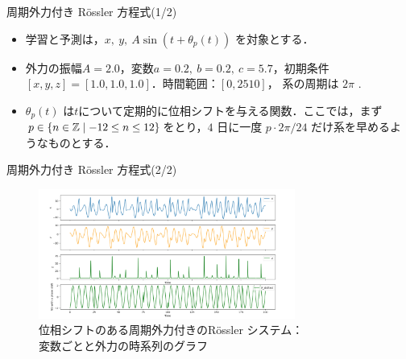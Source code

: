\begin{frame}{周期外力付き Rössler 方程式(1/2)}
\begin{minipage}{0.59\textwidth}
        \begin{itemize}
            \item 学習と予測は，$x,\ y,\ A \sin(t + \theta_p(t))$ を対象とする．
            \item 外力の振幅$A = 2.0$，変数$a = 0.2,\ b = 0.2,\ c = 5.7$，初期条件$ \left[ x, y, z \right] = [1.0, 1.0, 1.0]$．時間範囲：$[0, 2510]$， 系の周期は $2\pi$ .
            \item $\theta_p(t)$ は$t$について定期的に位相シフトを与える関数．ここでは，まず$p \in \left\{ n \in \mathbb{Z} \mid -12 \leq n \leq 12 \right\}$をとり，$4$ 日に一度 $p \cdot 2\pi/24$ だけ系を早めるようなものとする．    
        \end{itemize}
    \end{minipage}
\end{frame}

\begin{frame}{周期外力付き Rössler 方程式(2/2)}
    \begin{figure}
        \includegraphics[width=0.75\textwidth]{Fig/Plot_rossler_variables.png}
        \caption{位相シフトのある周期外力付きのRössler システム：\\変数ごとと外力の時系列のグラフ}
        \label{plot_rossler_attractor.png} %
    \end{figure}
\end{frame}


